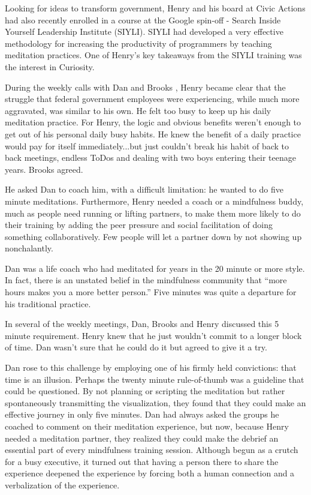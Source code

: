 \documentclass[12pt]{book}
\begin{document}
Looking for ideas to transform government, Henry and his board at Civic Actions had also recently enrolled in a course at the Google spin-off - Search Inside Yourself Leadership Institute (SIYLI). SIYLI had developed a very effective methodology for increasing the productivity of programmers by teaching meditation practices. One of Henry’s key takeaways from the SIYLI training was the interest in Curiosity.
					
During the weekly calls with Dan and Brooks , Henry became clear that the struggle that federal government employees were experiencing, while much more aggravated, was similar to his own. He felt too busy to keep up his daily meditation practice. For Henry, the logic and obvious benefits weren't enough to get out of his personal daily busy habits. He knew the benefit of a daily practice would pay for itself immediately...but just couldn't break his habit of back to back meetings, endless ToDos and dealing with two boys entering their teenage years. Brooks agreed.
					
He asked Dan to coach him, with a difficult limitation: he wanted to do five minute meditations. Furthermore, Henry needed a coach or a mindfulness buddy, much as people need running or lifting partners, to make them more likely to do their training by adding the peer pressure and social facilitation of doing something collaboratively. Few people will let a partner down by not showing up nonchalantly.
					
Dan was a life coach who had meditated for years in the 20 minute or more style. In fact, there is an unstated belief in the mindfulness community that “more hours makes you a more better person.” Five minutes was quite a departure for his traditional practice.
					
In several of the weekly meetings, Dan, Brooks and Henry discussed this 5 minute requirement. Henry knew that he just wouldn't commit to a longer block of time. Dan wasn't sure that he could do it but agreed to give it a try.
					
Dan rose to this challenge by employing one of his firmly held convictions: that time is an illusion. Perhaps the twenty minute rule-of-thumb was a guideline that could be questioned. By not planning or scripting the meditation but rather spontaneously transmitting the visualization, they found that they could make an effective journey in only five minutes. Dan had always asked the groups he coached to comment on their meditation experience, but now, because Henry needed a meditation partner, they realized they could make the debrief an essential part of every mindfulness training session. Although begun as a crutch for a busy executive, it turned out that having a person there to share the experience deepened the experience by forcing both a human connection and a verbalization of the experience.
					
\end{document}
